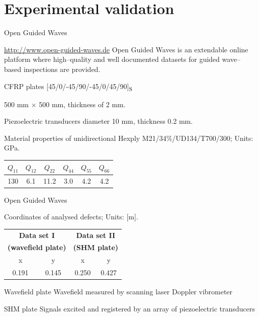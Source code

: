 \documentclass[10pt]{beamer} %
\begin{document}
\section{Experimental validation}
\begin{frame}{Open Guided Waves}
	\begin{block}{\url{http://www.open-guided-waves.de}}
		Open Guided Waves is an extendable online platform where high--quality and well documented datasets for guided wave--based inspections are provided.
	\end{block}

	CFRP plates [45/0/-45/90/-45/0/45/90]\textsubscript{S}
	
	500 mm $\times$ 500 mm, thickness of 2 mm. 
	
	Piezoelectric transducers diameter 10 mm, thickness 0.2 mm.
	
	\begin{table}
		\renewcommand{\arraystretch}{1.3}
		\centering \small
		Material properties of unidirectional Hexply M21/34\%/UD134/T700/300; Units: GPa.
		
		\begin{tabular}{cccccc} 
			\toprule
			$Q_{11}$ & $Q_{12}$  & $Q_{22}$ & $Q_{44}$ & $Q_{55}$ & $Q_{66}$\\
			\midrule
			130& 6.1& 11.2 & 3.0 & 4.2 & 4.2\\
			\bottomrule 
		\end{tabular} 
		\label{tab:mat_prop}
	\end{table}
\end{frame}
\begin{frame}{Open Guided Waves}

	\begin{table}
		\renewcommand{\arraystretch}{1.3}
		\centering \small
		Coordinates of analysed defects; Units: [m].
		
		\begin{tabular}{cccc} 
			\toprule
			\multicolumn{2}{c}{\textbf{Data set I} }	& \multicolumn{2}{c}{\textbf{Data set II} } \\
			\multicolumn{2}{c}{\textbf{(wavefield plate)} }	& \multicolumn{2}{c}{\textbf{(SHM plate)} } \\
			\cmidrule(lr){1-2} \cmidrule(lr){3-4}
			x & y &  x &  y  \\
			0.191 & 0.145 & 0.250  & 0.427 \\ 
			\bottomrule 
		\end{tabular} 
		\label{tab:defect_coordinates}
	\end{table}		
	\begin{block}{Wavefield plate}
		Wavefield measured by scanning laser Doppler vibrometer
	\end{block}
	\begin{block}{SHM plate}
		Signals excited and registered by an array of piezoelectric transducers
	\end{block}
\end{frame}
\end{document}

